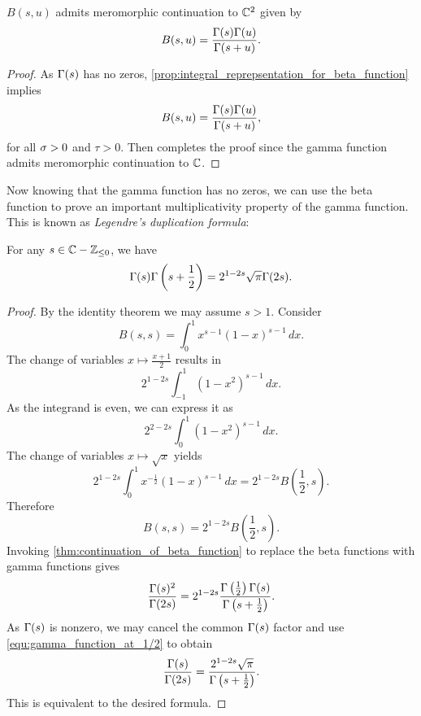 \documentclass[12pt]{article}
\begin{document}
    \begin{theorem}\label{thm:continuation_of_beta_function}
      \(B(s,u)\) admits meromorphic continuation to \(\mathbb{C}^{2}\) given by
      \[
        B(s,u) = \frac{\Gamma(s)\Gamma(u)}{\Gamma(s+u)}.
      \]
    \end{theorem}
    \begin{proof}
      As \(\Gamma(s)\) has no zeros, \cref{prop:integral_reprepsentation_for_beta_function} implies
      \[
        B(s,u) = \frac{\Gamma(s)\Gamma(u)}{\Gamma(s+u)},
      \]
      for all \(\sigma > 0\) and \(\tau > 0\). Then completes the proof since the gamma function admits meromorphic continuation to \(\mathbb{C}\).
    \end{proof}
    
    Now knowing that the gamma function has no zeros, we can use the beta function to prove an important multiplicativity property of the gamma function. This is known as \textit{Legendre's duplication formula}:

    \begin{theorem*}
      For any \(s \in \mathbb{C}-\mathbb{Z}_{\le 0}\), we have
      \[
        \Gamma(s)\Gamma\left(s+\frac{1}{2}\right) = 2^{1-2s}\sqrt{\pi}\Gamma(2s).
      \]
    \end{theorem*}
    \begin{proof}
      By the identity theorem we may assume \(s > 1\). Consider
      \[
        B(s,s) = \int_{0}^{1}x^{s-1}(1-x)^{s-1}\,dx.
      \]
      The change of variables \(x \mapsto \frac{x+1}{2}\) results in
      \[
        2^{1-2s}\int_{-1}^{1}(1-x^{2})^{s-1}\,dx.
      \]
      As the integrand is even, we can express it as
      \[
        2^{2-2s}\int_{0}^{1}(1-x^{2})^{s-1}\,dx.
      \]
      The change of variables \(x \mapsto \sqrt{x}\) yields
      \[
        2^{1-2s}\int_{0}^{1}x^{-\frac{1}{2}}(1-x)^{s-1}\,dx = 2^{1-2s}B\left(\frac{1}{2},s\right).
      \]
      Therefore
      \[
        B(s,s) = 2^{1-2s}B\left(\frac{1}{2},s\right).
      \]
      Invoking \cref{thm:continuation_of_beta_function} to replace the beta functions with gamma functions gives
      \[
        \frac{\Gamma(s)^{2}}{\Gamma(2s)} = 2^{1-2s}\frac{\Gamma\left(\frac{1}{2}\right)\Gamma(s)}{\Gamma\left(s+\frac{1}{2}\right)}.
      \]
      As \(\Gamma(s)\) is nonzero, we may cancel the common \(\Gamma(s)\) factor and use \cref{equ:gamma_function_at_1/2} to obtain
      \[
        \frac{\Gamma(s)}{\Gamma(2s)} = \frac{2^{1-2s}\sqrt{\pi}}{\Gamma\left(s+\frac{1}{2}\right)}.
      \]
      This is equivalent to the desired formula.
    \end{proof}
\end{document}
